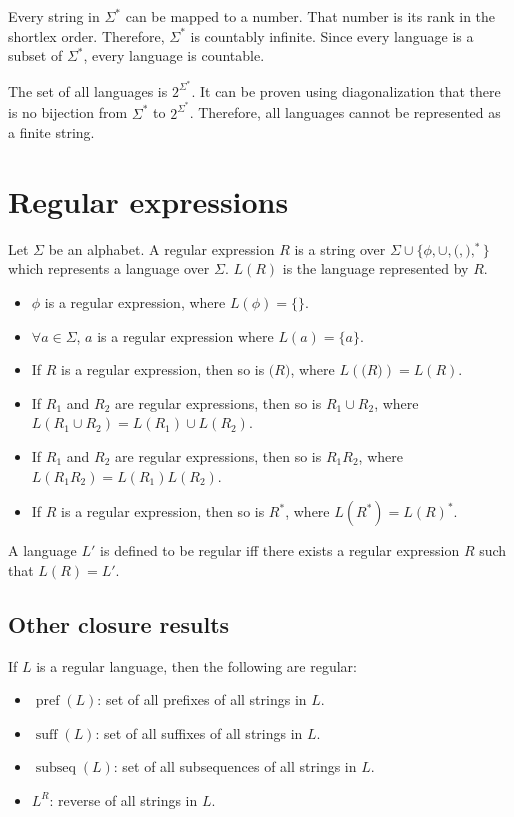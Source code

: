 Every string in $\Sigma^*$ can be mapped to a number. That number is its rank in the shortlex order.
Therefore, $\Sigma^*$ is countably infinite.
Since every language is a subset of $\Sigma^*$, every language is countable.

The set of all languages is $2^{\Sigma^*}$.
It can be proven using diagonalization that there is no bijection from $\Sigma^*$ to $2^{\Sigma^*}$.
Therefore, all languages cannot be represented as a finite string.

\section{Regular expressions}

Let $\Sigma$ be an alphabet.
A regular expression $R$ is a string over
$\Sigma \cup \{\phi, \cup, \texttt{(}, \texttt{)}, ^* \}$
which represents a language over $\Sigma$. $L(R)$ is the language represented by $R$.

\begin{itemize}
\item $\phi$ is a regular expression, where $L(\phi) = \{\}$.
\item $\forall a \in \Sigma$, $a$ is a regular expression where $L(a) = \{a\}$.
\item If $R$ is a regular expression, then so is $\texttt{(}R\texttt{)}$,
    where $L(\texttt{(}R\texttt{)}) = L(R)$.
\item If $R_1$ and $R_2$ are regular expressions, then so is $R_1 \cup R_2$,
    where $L(R_1 \cup R_2) = L(R_1) \cup L(R_2)$.
\item If $R_1$ and $R_2$ are regular expressions, then so is $R_1 R_2$,
    where $L(R_1 R_2) = L(R_1) L(R_2)$.
\item If $R$ is a regular expression, then so is $R^*$,
    where $L(R^*) = L(R)^*$.
\end{itemize}

A language $L'$ is defined to be regular iff there exists a regular expression $R$
such that $L(R) = L'$.

\subsection{Other closure results}

\begin{theorem}
If $L$ is a regular language, then the following are regular:

\begin{itemize}
\item $\operatorname{pref}(L)$: set of all prefixes of all strings in $L$.
\item $\operatorname{suff}(L)$: set of all suffixes of all strings in $L$.
\item $\operatorname{subseq}(L)$: set of all subsequences of all strings in $L$.
\item $L^R$: reverse of all strings in $L$.
\end{itemize}
\end{theorem}

